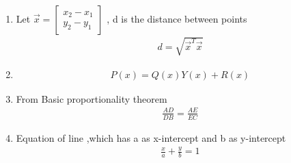\begin{enumerate}[label=\thesubsection.\arabic*, ref=\thesubsection.\theenumi]
	
	
	\item
	 Let $ \vec{x} =\begin{bmatrix}
	 	x_2 - x_1 \\
	 	y_2 - y_1
	 	\end{bmatrix}$ , d is the distance between points
	\begin{align} 
		d=\sqrt{\vec{x}^T\vec{x}}\label{eq:EE26BTECH11222-prob 4}
	\end{align}
	
	\item 
	\begin{align}
		P(x)=Q(x)Y(x)+R(x) \label{eq:ee26btech11222-prob 6}
	\end{align}
	
	\item From Basic proportionality theorem
	\begin{align}
		\frac{AD}{DB}=\frac{AE}{EC} \label{eq:ee26btech11222-prob_10 7}
	\end{align}
	
	\item Equation of line ,which has a as x-intercept and b as y-intercept
	\begin{align}
		\frac{x}{a} +\frac{y}{b}=1
	\end{align}
	
\end{enumerate}
